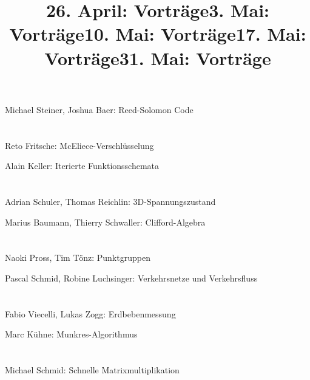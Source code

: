 \documentclass[aspectratio=169]{beamer}
\author[]{}
\begin{document}
\title[Vorträge]{26. April: Vorträge}
\begin{frame}
\titlepage
\vspace{-2cm}
\begin{center}
Michael Steiner, Joshua Baer: Reed-Solomon Code
\phantom{blubb} \\
\phantom{blubb} \\
\phantom{blubb} \\
Reto Fritsche: McEliece-Verschlüsselung
\end{center}
\end{frame}

\title[Vorträge]{3. Mai: Vorträge}
\begin{frame}
\titlepage
\vspace{-2cm}
\begin{center}
Alain Keller: Iterierte Funktionsschemata
\phantom{blubb} \\
\phantom{blubb} \\
\phantom{blubb} \\
Adrian Schuler, Thomas Reichlin: 3D-Spannungszustand
\end{center}
\end{frame}

\title[Vorträge]{10. Mai: Vorträge}
\begin{frame}
\titlepage
\vspace{-2cm}
\begin{center}
Marius Baumann, Thierry Schwaller: Clifford-Algebra
\phantom{blubb} \\
\phantom{blubb} \\
\phantom{blubb} \\
Naoki Pross, Tim Tönz: Punktgruppen
\end{center}
\end{frame}

\title[Vorträge]{17. Mai: Vorträge}
\begin{frame}
\titlepage
\vspace{-2cm}
\begin{center}
Pascal Schmid, Robine Luchsinger: Verkehrsnetze und Verkehrsfluss
\phantom{blubb} \\
\phantom{blubb} \\
\phantom{blubb} \\
Fabio Viecelli, Lukas Zogg: Erdbebenmessung
\end{center}
\end{frame}

\title[Vorträge]{31. Mai: Vorträge}
\begin{frame}
\titlepage
\vspace{-2cm}
\begin{center}
Marc Kühne: Munkres-Algorithmus
\phantom{blubb} \\
\phantom{blubb} \\
\phantom{blubb} \\
Michael Schmid: Schnelle Matrixmultiplikation
\end{center}
\end{frame}


\end{document}
